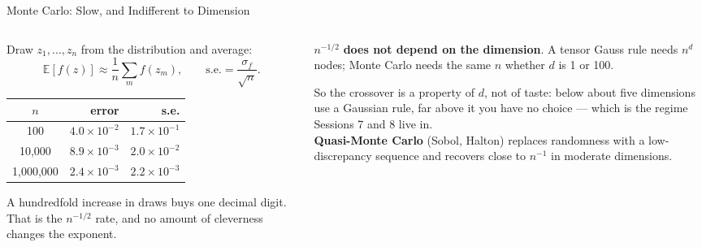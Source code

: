 \begin{frame}{Monte Carlo: Slow, and Indifferent to Dimension}
\begin{columns}[T]
\begin{column}{0.51\textwidth}
\small
Draw $z_1,\dots,z_n$ from the distribution and average:
\[
  \mathbb{E}[f(z)]\approx\frac1n\sum_{m} f(z_m),
  \qquad \text{s.e.}=\frac{\sigma_f}{\sqrt n}.
\]
\begin{center}\footnotesize
\begin{tabularx}{\linewidth}{@{}c r r@{}}
\toprule
$n$ & \textbf{error} & \textbf{s.e.} \\
\midrule
100 & $4.0\times10^{-2}$ & $1.7\times10^{-1}$ \\
10{,}000 & $8.9\times10^{-3}$ & $2.0\times10^{-2}$ \\
1{,}000{,}000 & $2.4\times10^{-3}$ & $2.2\times10^{-3}$ \\
\bottomrule
\end{tabularx}
\end{center}
\medskip
\footnotesize
A hundredfold increase in draws buys one decimal digit. That is the $n^{-1/2}$ rate, and no amount of cleverness changes the exponent.
\end{column}
\begin{column}{0.46\textwidth}
\begin{conceptbox}[title=\textbf{And yet it wins, eventually}]\small
$n^{-1/2}$ \textbf{does not depend on the dimension}. A tensor Gauss rule needs $n^{d}$ nodes; Monte Carlo needs the same $n$ whether $d$ is 1 or 100.
\end{conceptbox}
\medskip
\begin{takeawaybox}\footnotesize
So the crossover is a property of $d$, not of taste: below about five dimensions use a Gaussian rule, far above it you have no choice --- which is the regime Sessions 7 and 8 live in.\\[1mm]
\textbf{Quasi-Monte Carlo} (Sobol, Halton) replaces randomness with a low-discrepancy sequence and recovers close to $n^{-1}$ in moderate dimensions.
\end{takeawaybox}
\end{column}
\end{columns}
\end{frame}

